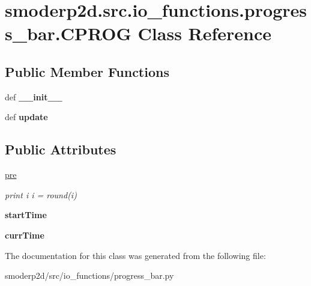 \hypertarget{classsmoderp2d_1_1src_1_1io__functions_1_1progress__bar_1_1CPROG}{\section{smoderp2d.\-src.\-io\-\_\-functions.\-progress\-\_\-bar.\-C\-P\-R\-O\-G Class Reference}
\label{classsmoderp2d_1_1src_1_1io__functions_1_1progress__bar_1_1CPROG}
}
\subsection*{Public Member Functions}
\begin{DoxyCompactItemize}
\item 
\hypertarget{classsmoderp2d_1_1src_1_1io__functions_1_1progress__bar_1_1CPROG_ab17498ec58d6a6a8da846fe178dda15a}{def {\bfseries \-\_\-\-\_\-init\-\_\-\-\_\-}}\label{classsmoderp2d_1_1src_1_1io__functions_1_1progress__bar_1_1CPROG_ab17498ec58d6a6a8da846fe178dda15a}

\item 
\hypertarget{classsmoderp2d_1_1src_1_1io__functions_1_1progress__bar_1_1CPROG_aed7dbe1604e19325619d67dece13f994}{def {\bfseries update}}\label{classsmoderp2d_1_1src_1_1io__functions_1_1progress__bar_1_1CPROG_aed7dbe1604e19325619d67dece13f994}

\end{DoxyCompactItemize}
\subsection*{Public Attributes}
\begin{DoxyCompactItemize}
\item 
\hypertarget{classsmoderp2d_1_1src_1_1io__functions_1_1progress__bar_1_1CPROG_af8242685ed25599ff6320b17d7ecc97f}{\hyperlink{classsmoderp2d_1_1src_1_1io__functions_1_1progress__bar_1_1CPROG_af8242685ed25599ff6320b17d7ecc97f}{pre}}\label{classsmoderp2d_1_1src_1_1io__functions_1_1progress__bar_1_1CPROG_af8242685ed25599ff6320b17d7ecc97f}

\begin{DoxyCompactList}\small\item\em print i i = round(i) \end{DoxyCompactList}\item 
\hypertarget{classsmoderp2d_1_1src_1_1io__functions_1_1progress__bar_1_1CPROG_ae43bff15d5e6b6571009fc2459e7d9a4}{{\bfseries start\-Time}}\label{classsmoderp2d_1_1src_1_1io__functions_1_1progress__bar_1_1CPROG_ae43bff15d5e6b6571009fc2459e7d9a4}

\item 
\hypertarget{classsmoderp2d_1_1src_1_1io__functions_1_1progress__bar_1_1CPROG_aa437f963e707b59285914615876cd745}{{\bfseries curr\-Time}}\label{classsmoderp2d_1_1src_1_1io__functions_1_1progress__bar_1_1CPROG_aa437f963e707b59285914615876cd745}

\end{DoxyCompactItemize}


The documentation for this class was generated from the following file\-:\begin{DoxyCompactItemize}
\item 
smoderp2d/src/io\-\_\-functions/progress\-\_\-bar.\-py\end{DoxyCompactItemize}
